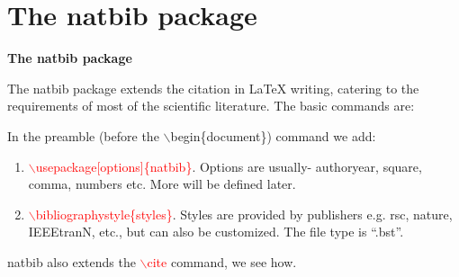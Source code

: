 \section{The natbib package}
\begin{frame}[t,fragile]{\textbf{\textbf{The natbib package}}}


The natbib package extends the citation in \LaTeX{} writing, catering to the requirements of most of the scientific literature. The basic commands are:\\
\vspace{0.2cm}

In the preamble (before the $\backslash$begin\{document\}) command we add:\\
\vspace{0.2cm}

\begin{enumerate}
\item \textcolor{red}{$\backslash$usepackage[options]\{natbib\}}. Options are usually- authoryear, square, comma, numbers etc. More will be defined later.\\
\vspace{0.2cm}

 \item \textcolor{red}{$\backslash$bibliographystyle\{styles\}}. Styles are provided by publishers e.g. rsc, nature, IEEEtranN, etc., but can also be customized. The file type is ``.bst''. 
 
\end{enumerate}

natbib also extends the \textcolor{red}{$\backslash$cite} command, we see how. 
\end{frame}


